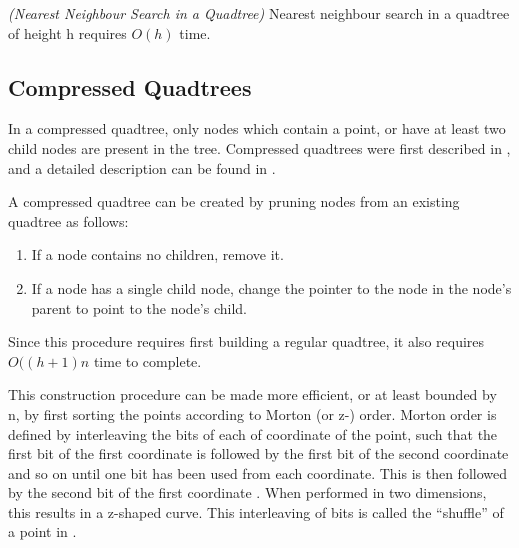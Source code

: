 \documentclass[mcs]{scsthesis}
\begin{document}
\begin{thm} \emph{(Nearest Neighbour Search in a Quadtree)} 
Nearest neighbour search in a quadtree of height h requires \(O(h)\) time.
\end{thm}

\subsection{Compressed Quadtrees}

In a compressed quadtree, only nodes which contain a point, or have at least
two child nodes are present in the tree. Compressed quadtrees were first
described in \cite{compressedquadtree}, and a detailed description can be found
in \cite{skipquadtree}.

A compressed quadtree can be created by pruning nodes from an existing quadtree
as follows:

\begin{enumerate}
\item If a node contains no children, remove it.
\item If a node has a single child node, change the pointer to the node in the
node's parent to point to the node's child.
\end{enumerate}

Since this procedure requires first building a regular quadtree, it also
requires \(O((h + 1)n\) time to complete.

This construction procedure can be made more efficient, or at least bounded by
n, by first sorting the points according to Morton (or z-) order. Morton order
is defined by interleaving the bits of each of coordinate of the point, such
that the first bit of the first coordinate is followed by the first bit of the
second coordinate and so on until one bit has been used from each coordinate.
This is then followed by the second bit of the first coordinate \cite{morton}.
When performed in two dimensions, this results in a z-shaped curve. This
interleaving of bits is called the ``shuffle'' of a point in \cite{bern}.
\end{document}
